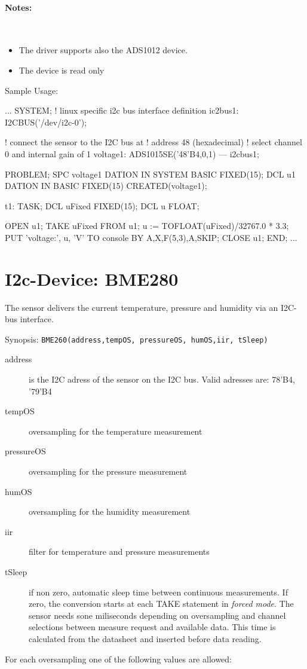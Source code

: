 \paragraph{Notes:} \ 
\begin{itemize}
\item The driver supports also the ADS1012 device.
\item The device is read only
\end{itemize}

Sample Usage:
\begin{PEARLCode}
...
SYSTEM;
   ! linux specific i2c bus interface definition
   ic2bus1: I2CBUS('/dev/i2c-0');

   ! connect the sensor to the I2C bus at 
   ! address 48 (hexadecimal)
   ! select channel 0 and internal gain of 1
   voltage1: ADS1015SE('48'B4,0,1) --- i2cbus1;

PROBLEM;
   SPC voltage1 DATION IN SYSTEM BASIC FIXED(15);
   DCL u1 DATION IN BASIC FIXED(15) CREATED(voltage1);

t1: TASK;
   DCL uFixed FIXED(15);
   DCL u FLOAT;
 
   OPEN u1;
   TAKE uFixed FROM u1;
   u := TOFLOAT(uFixed)/32767.0 * 3.3;
   PUT 'voltage:', u, 'V' TO console BY A,X,F(5,3),A,SKIP;
   CLOSE u1;
END;
...
\end{PEARLCode}


\section{I2c-Device: BME280}
The sensor delivers the current temperature, pressure and humidity
 via an I2C-bus interface.

Synopsis: \texttt{BME260(address,tempOS, pressureOS, humOS,iir, tSleep)}

\begin{description}
\item[address] is the I2C adress of the sensor on the I2C bus.
   Valid adresses are: 78'B4, '79'B4
\item[tempOS] oversampling for the temperature measurement
\item[pressureOS] oversampling for the pressure measurement
\item[humOS] oversampling for the humidity measurement
\item[iir] filter for temperature and pressure measurements
\item [tSleep] if non zero, automatic sleep time between
 continuous measurements. 
If zero, the conversion starts at each TAKE  statement
 in \textit{forced mode}. The sensor needs sone miliseconds depending
on oversampling and channel selections between measure
 request and available data. This time is calculated from the
  datasheet and inserted before data reading.
\end{description}
For each oversampling one of the following values are allowed:

